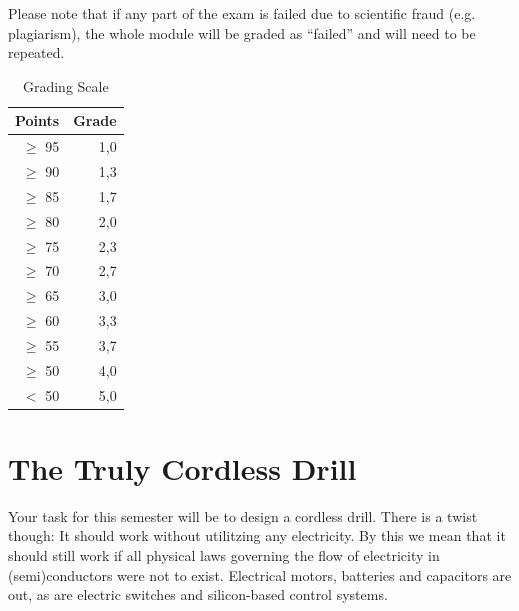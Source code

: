 \documentclass[headinclude=true]{scrreprt}
\begin{document}
Please note that if any part of the exam is failed due to scientific fraud (e.g. plagiarism), the whole module will be graded as ``failed'' and will need to be repeated.

\begin{table} \centering
 \caption{Grading Scale}
 \label{tab:notenskala}
 \begin{tabular}{rr}
  \toprule
  Points & Grade \\ \midrule
  $\geq$ 95 & 1,0 \\
  $\geq$ 90 & 1,3 \\
  $\geq$ 85 & 1,7 \\
  $\geq$ 80 & 2,0 \\
  $\geq$ 75 & 2,3 \\
  $\geq$ 70 & 2,7 \\
  $\geq$ 65 & 3,0 \\
  $\geq$ 60 & 3,3 \\
  $\geq$ 55 & 3,7 \\
  $\geq$ 50 & 4,0 \\
  $<$ 50 & 5,0 \\ \bottomrule
 \end{tabular}
\end{table}

\chapter{The Truly Cordless Drill}
\label{chap:projektaufgabe}

Your task for this semester will be to design a cordless drill. There is a twist though: It should work without utilitzing any electricity. By this we mean that it should still work if all physical laws governing the flow of electricity in (semi)conductors were not to exist. Electrical motors, batteries and capacitors are out, as are electric switches and silicon-based control systems.




\printbibliography

\appendix
\end{document}
